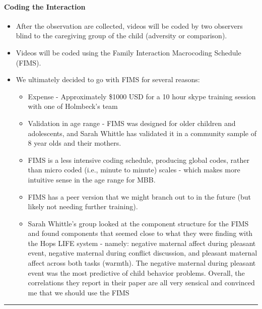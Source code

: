 \documentclass[]{book}
\providecommand{\tightlist}{%
  \setlength{\itemsep}{0pt}\setlength{\parskip}{0pt}}
\let\oldparagraph\paragraph
\renewcommand{\paragraph}[1]{\oldparagraph{#1}\mbox{}}
\begin{document}
\hypertarget{coding-the-interaction}{%
\paragraph{Coding the Interaction}\label{coding-the-interaction}}

\begin{itemize}
\item
  After the observation are collected, videos will be coded by two observers blind to the caregiving group of the child (adversity or comparison).
\item
  Videos will be coded using the Family Interaction Macrocoding Schedule (FIMS)\citep{holmbeck_1995}.
\item
  We ultimately decided to go with FIMS for several reasons:

  \begin{itemize}
  \tightlist
  \item
    Expense - Approximately \$1000 USD for a 10 hour skype training session with one of Holmbeck's team
  \item
    Validation in age range - FIMS was designed for older children and adolescents, and Sarah Whittle has validated it in a community sample of 8 year olds and their mothers.
  \item
    FIMS is a less intensive coding schedule, producing global codes, rather than micro coded (i.e., minute to minute) scales - which makes more intuitive sense in the age range for MBB.
  \item
    FIMS has a peer version that we might branch out to in the future (but likely not needing further training)\citep{holbein_2014}.
  \item
    Sarah Whittle's group looked at the component structure for the FIMS and found components that seemed close to what they were finding with the Hops LIFE system - namely: negative maternal affect during pleasant event, negative maternal during conflict discussion, and pleasant maternal affect across both tasks (warmth). The negative maternal during pleasant event was the most predictive of child behavior problems. Overall, the correlations they report in their paper are all very sensical and convinced me that we should use the FIMS \citep{richmond_2018}
  \end{itemize}
\end{itemize}

\begin{center}\rule{0.5\linewidth}{0.5pt}\end{center}
\end{document}
